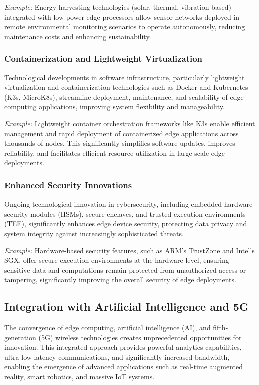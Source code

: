 \documentclass[runningheads]{llncs}
\begin{document}
\textit{Example:} Energy harvesting technologies (solar, thermal, vibration-based) integrated with low-power edge processors allow sensor networks deployed in remote environmental monitoring scenarios to operate autonomously, reducing maintenance costs and enhancing sustainability.

\subsubsection{Containerization and Lightweight Virtualization}
Technological developments in software infrastructure, particularly lightweight virtualization and containerization technologies such as Docker and Kubernetes (K3s, MicroK8s), streamline deployment, maintenance, and scalability of edge computing applications, improving system flexibility and manageability.

\textit{Example:} Lightweight container orchestration frameworks like K3s enable efficient management and rapid deployment of containerized edge applications across thousands of nodes. This significantly simplifies software updates, improves reliability, and facilitates efficient resource utilization in large-scale edge deployments.

\subsubsection{Enhanced Security Innovations}
Ongoing technological innovation in cybersecurity, including embedded hardware security modules (HSMs), secure enclaves, and trusted execution environments (TEE), significantly enhances edge device security, protecting data privacy and system integrity against increasingly sophisticated threats.

\textit{Example:} Hardware-based security features, such as ARM's TrustZone and Intel's SGX, offer secure execution environments at the hardware level, ensuring sensitive data and computations remain protected from unauthorized access or tampering, significantly improving the overall security of edge deployments.


\subsection{Integration with Artificial Intelligence and 5G}

The convergence of edge computing, artificial intelligence (AI), and fifth-generation (5G) wireless technologies creates unprecedented opportunities for innovation. This integrated approach provides powerful analytics capabilities, ultra-low latency communications, and significantly increased bandwidth, enabling the emergence of advanced applications such as real-time augmented reality, smart robotics, and massive IoT systems.
\end{document}
